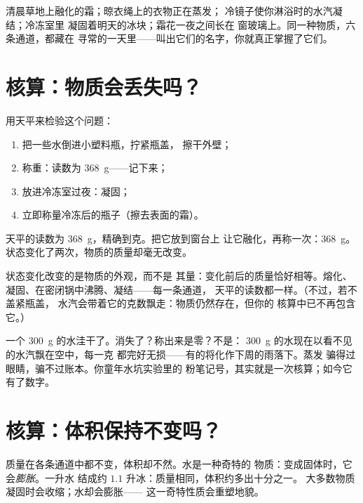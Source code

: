 \begin{example}[身边的通道]\label{ex:g6:water-states:doors}
清晨草地上融化的霜；晾衣绳上的衣物正在蒸发；
冷镜子使你淋浴时的水汽凝结；冷冻室里
凝固着明天的冰块；霜花一夜之间长在
窗玻璃上。同一种物质，六条通道，都藏在
寻常的一天里——叫出它们的名字，你就真正掌握了它们。
\end{example}

\section{核算：物质会丢失吗？}

\begin{method}[称量状态变化]\label{met:g6:water-states:weigh}
用天平来检验这个问题：
\begin{enumerate}
  \item 把一些水倒进小塑料瓶，拧紧瓶盖，
        擦干外壁；
  \item 称重：读数为 \qty{368}{g}——记下来；
  \item 放进冷冻室过夜：凝固；
  \item 立即称量冷冻后的瓶子（擦去表面的霜）。
\end{enumerate}
天平的读数为 \qty{368}{g}，精确到克。把它放到窗台上
让它融化，再称一次：\qty{368}{g}。
状态变化了两次，物质的质量却毫无改变。
\end{method}

\begin{proposition}[状态变化不改变质量]\label{prop:g6:water-states:mass}
状态变化改变的是物质的外观，而不是
其量：变化前后的质量恰好相等。熔化、
凝固、在密闭锅中沸腾、凝结——每一条通道，
天平的读数都一样。（不过，若不盖紧瓶盖，
水汽会带着它的克数飘走：物质仍然存在，但你的
核算中已不再包含它。）
\end{proposition}

\begin{example}[水坑里的克数去哪儿了]\label{ex:g6:water-states:puddle}
一个 \qty{300}{g} 的水洼干了。消失了？称出来是零？不是：
\qty{300}{g} 的水现在以看不见的水汽飘在空中，每一克
都完好无损——有的将化作下周的雨落下。蒸发
骗得过眼睛，骗不过账本。你童年水坑实验里的
粉笔记号，其实就是一次核算；如今它有了数字。
\end{example}

\section{核算：体积保持不变吗？}

\begin{proposition}[水结冰时体积膨胀]\label{prop:g6:water-states:volume}
质量在各条通道中都不变，体积却不然。水是一种奇特的
物质：变成固体时，它会\emph{膨胀}。一升水
结成约 $1.1$ 升冰：质量相同，体积约多出十分之一。
大多数物质凝固时会收缩；水却会膨胀——
这一奇特性质会重塑地貌。
\end{proposition}

